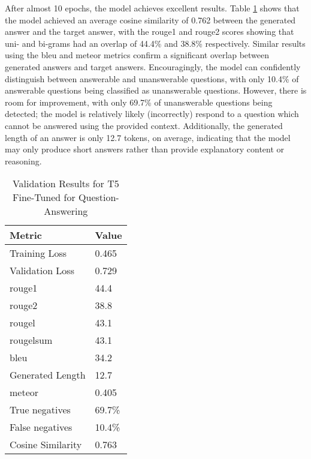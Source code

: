 After almost 10 epochs, the model achieves excellent results. Table \ref{tab:results_t5} shows that the model achieved an average cosine similarity of 0.762 between the generated answer and the target answer, with the \acrshort{rouge}1 and \acrshort{rouge}2 scores showing that uni- and bi-grams had an overlap of 44.4\% and 38.8\% respectively. Similar results using the \acrshort{bleu} and \acrshort{meteor} metrics confirm a significant overlap between generated answers and target answers. Encouragingly, the model can confidently distinguish between answerable and unanswerable questions, with only 10.4\% of answerable questions being classified as unanswerable questions. However, there is room for improvement, with only 69.7\% of unanswerable questions being detected; the model is relatively likely (incorrectly) respond to a question which cannot be answered using the provided context. Additionally, the generated length of an answer is only 12.7 tokens, on average, indicating that the model may only produce short answers rather than provide explanatory content or reasoning. 

\begin{table}[ht!]
    \centering
    \caption{Validation Results for T5 Fine-Tuned for Question-Answering}
    \begin{tabular}{l|l}
        \textbf{Metric} & \textbf{Value} \\ \hline
        Training Loss & 0.465 \\ \hline
        Validation Loss & 0.729 \\ \hline
        \acrshort{rouge}1 & 44.4 \\ \hline
        \acrshort{rouge}2 & 38.8 \\ \hline
        \acrshort{rouge}l & 43.1 \\ \hline
        \acrshort{rouge}lsum & 43.1 \\ \hline
        \acrshort{bleu} & 34.2 \\ \hline
        Generated Length & 12.7 \\ \hline
        \acrshort{meteor} & 0.405 \\ \hline
        True negatives & 69.7\% \\ \hline
        False negatives & 10.4\% \\ \hline
        Cosine Similarity & 0.763 \\
    \end{tabular}
    \label{tab:results_t5}
\end{table}


